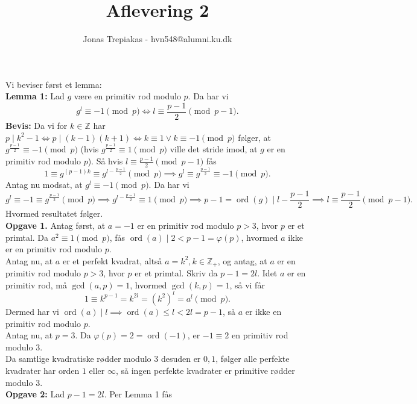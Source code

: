 \documentclass[a4paper]{article}
\title{Aflevering 2}
\author{Jonas Trepiakas - hvn548@alumni.ku.dk}
\date{}
\DeclareMathOperator{\ord}{ord}
\begin{document}
\maketitle
\newpage
Vi beviser først et lemma:\\
\linebreak
\textbf{Lemma 1:} Lad $g$ være en primitiv rod modulo $p$. Da har vi
\[
    g^{l} \equiv -1 \pmod{p} \iff l \equiv \frac{p-1}{2} \pmod{p-1}
.\] 
\textbf{Bevis:} Da vi for $k \in \mathbb{Z}$ har $p  \mid k^2 -1 \iff
p  \mid (k-1)(k+1) \iff k\equiv 1 \lor k \equiv -1 \pmod{p}$ følger, at 
$g^{\frac{p-1}{2}} \equiv -1 \pmod{p}$ (hvis $g^{\frac{p-1}{2}} \equiv
1 \pmod{p}$ ville det stride imod, at $g$ er en primitiv rod modulo $p$). Så
hvis $l \equiv \frac{p-1}{2} \pmod{p-1}$ fås
\[
    1 \equiv g^{(p-1)k} \equiv g^{l - \frac{p-1}{2}} \pmod{p} \implies g^{l}
    \equiv g^{\frac{p-1}{2}} \equiv -1 \pmod{p}
.\]
Antag nu modsat, at $g^{l} \equiv -1 \pmod{p}$. Da har vi
\[
    g^{l} \equiv -1 \equiv g^{\frac{p-1}{2}} \pmod{p} \implies g^{l
    - \frac{p-1}{2}} \equiv 1 \pmod{p} \implies p-1 = \ord(g)  \mid l-
    \frac{p-1}{2} \implies l \equiv \frac{p-1}{2} \pmod{p-1}
.\] 
Hvormed resultatet følger.\\
\linebreak
    \textbf{Opgave 1.} Antag først, at $a=-1$ er en primitiv rod modulo $p>3$,
    hvor $p$ er et primtal. Da $a^2 \equiv 1 \pmod{p}$, fås $\ord (a) \mid
    2 < p-1 = \varphi (p) $, hvormed $a$ ikke er en primitiv rod modulo $p$.\\
    Antag nu, at $a$ er et perfekt kvadrat, altså $a=k^2, k \in
    \mathbb{Z}_{+}$, og antag, at $a$ er en primitiv rod modulo  $p>3$, hvor
    $p$ er et primtal. Skriv da $p-1 = 2 l$. Idet $a$ er en primitiv rod, må
    $\gcd(a,p)=1$, hvormed $\gcd(k,p)=1$, så vi får
    \[
        1 \equiv k^{p-1} = k^{2l} = \left( k^2 \right)^{l} = a^{l} \pmod{p}
    .\] 
    Dermed har vi $\ord (a)  \mid l \implies \ord (a)
    \le l < 2l = p-1$, så $a$ er ikke en primitiv rod
    modulo $p$.\\
    \linebreak
    Antag nu, at $p=3$. Da $\varphi(p)=2 = \ord(-1)$, er $-1 \equiv 2$ en
    primitiv rod modulo $3$.\\
    Da samtlige kvadratiske rødder modulo $3$ desuden er $0,1$, følger alle
    perfekte kvadrater har orden $1$ eller $\infty$, så ingen perfekte
    kvadrater er primitive rødder modulo $3$.\\
    \linebreak
    \textbf{Opgave 2:} Lad $p-1=2l$. Per Lemma 1 fås 
\end{document}
